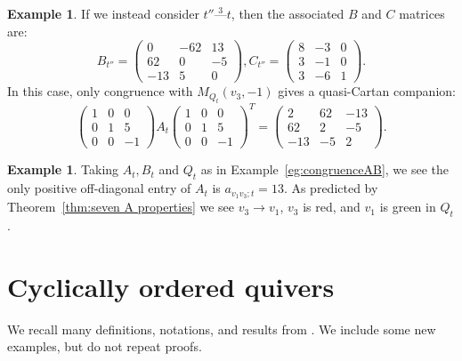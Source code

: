 \documentclass[11pt, letterpaper]{amsart}
\theoremstyle{definition}
\newtheorem{example}[theorem]{Example}
\numberwithin{equation}{section}
\begin{document}
\begin{example}
If we instead consider $t'' \stackrel{3}{\text{---}}t$, %
then the associated $B$ and $C$ matrices are:
$$B_{t''} = 
\begin{pmatrix} 
0 & -62 & 13 \\
62 & 0 & -5 \\
-13 & 5 & 0
\end{pmatrix}, C_{t''} = 
\begin{pmatrix} 8 & -3 & 0 \\ 3 & -1 & 0 \\ 3 & -6 & 1 \end{pmatrix}.$$
In this case, only congruence with $M_{Q_t}(v_3, -1)$ gives a quasi-Cartan companion:
$$ \begin{pmatrix} 
1 & 0 & 0 \\
0 & 1 & 5 \\
0 & 0 & -1 
\end{pmatrix} A_t 
\begin{pmatrix} 
1 & 0 & 0 \\
0 & 1 & 5 \\
0 & 0 & -1 
\end{pmatrix}^T =  \begin{pmatrix} 
2 & 62 & -13 \\
62 & 2 & -5 \\
-13 & -5 & 2
\end{pmatrix}. $$
\end{example}

\begin{example}
\label{eg:Check signs of A t}
Taking $A_t, B_t$ and $Q_t$ as in Example~\ref{eg:congruenceAB}, we see the only positive off-diagonal entry of $A_t$ is $a_{v_1v_3;t} = 13$.
As predicted by Theorem~\ref{thm:seven A properties} we see $v_3 \rightarrow v_1$, $v_3$ is red, and $v_1$ is green in $Q_t$.
\end{example}

\newpage

\section{Cyclically ordered quivers}
\label{sec:coqs}

We recall many definitions, notations, and results from \cite{COQ}. 
We include some new examples, but do not repeat proofs.
\end{document}
